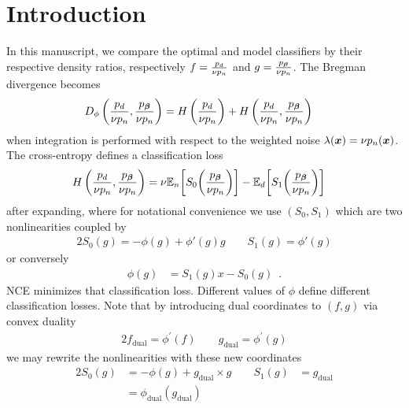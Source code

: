 
\newcommand{\pd}{{\color{black} p_d}}
\newcommand{\pn}{{\color{black} p_n}}

\section{Introduction}
\label{sec:intro}


In this manuscript, we compare the optimal and model classifiers by their respective density ratios, respectively $f = \frac{\pd}{\nu \pn}$ and $g = \frac{p_{\vbeta}}{\nu \pn}$. The Bregman divergence becomes
%
\begin{align*}
    D_{\phi} \left(
    \frac{\pd}{\nu \pn}
    , 
    \frac{p_{\vbeta}}{\nu \pn}
    \right)
    &=
    H \left( 
    \frac{\pd}{\nu \pn} 
    \right) 
    + 
    H \left( 
    \frac{\pd}{\nu \pn}
    ,
    \frac{p_{\vbeta}}{\nu \pn}
    \right) 
\end{align*}
%
when integration is performed with respect to the weighted noise $\lambda(\vx) = \nu \pn(\vx)$. The cross-entropy defines a classification loss 
%
\begin{align*}
    H \left( 
    \frac{\pd}{\nu \pn}
    ,
    \frac{p_{\vbeta}}{\nu \pn}
    \right) 
    &=
    \nu \E_n
    \bigg[
    S_0
    \bigg(
    \frac{p_\vbeta}{\nu \pn}
    \bigg)
    \bigg]
    -
    \E_d
    \bigg[
    S_1
    \bigg(
    \frac{p_\vbeta}{\nu \pn}
    \bigg)
    \bigg]
\end{align*}
%
after expanding, where for notational convenience we use $(S_0, S_1)$ which are two nonlinearities coupled by
%
\begin{alignat*}{2}
    S_0(g) = -\phi(g) + \phi'(g)g  
    \hspace{2em}
    S_1(g) = \phi'(g)
\end{alignat*}
%
\noindent or conversely
%
\begin{align*}
    \phi(g) &= S_1(g) x - S_0(g)
    \enspace .
\end{align*}
%
NCE minimizes that classification loss. Different values of $\phi$ define different classification losses. 
% 
Note that by introducing dual coordinates to $(f, g)$ via convex duality
%
\begin{alignat*}{2}
    f_{\mathrm{dual}} = \phi^{'}(f)
    \hspace{2em}
    g_{\mathrm{dual}} =  \phi^{'}(g)
\end{alignat*}
%
we may rewrite the nonlinearities with these new coordinates
%
\begin{alignat*}{2}
    S_0(g) 
    & = 
    -\phi(g) + g_{\mathrm{dual}} \times g  
    \hspace{2em}
    S_1(g) 
    & = 
    g_{\mathrm{dual}} 
    \\
    {}
    & = 
    \phi_{\mathrm{dual}}(g_{\mathrm{dual}})
\end{alignat*}
